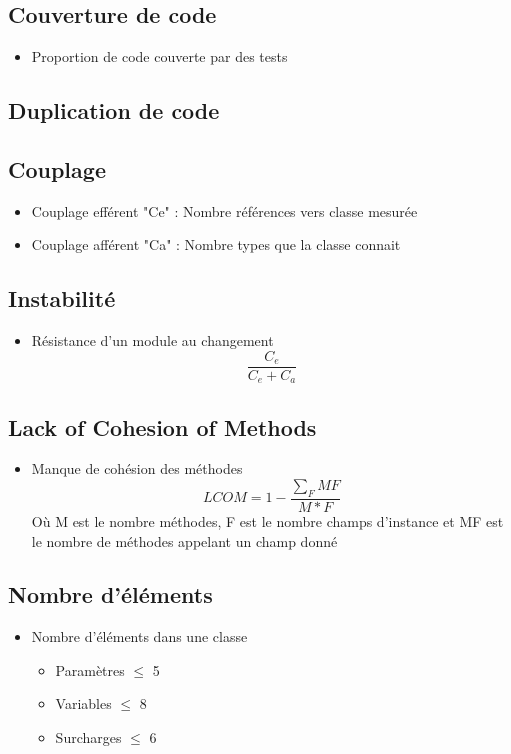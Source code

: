 \documentclass[10pt,a4paper]{article}
\begin{document}
\subsection*{Couverture de code}
\begin{itemize}
\item Proportion de code couverte par des tests  
\end{itemize}

\subsection*{Duplication de code}  

\subsection*{Couplage}  
\begin{itemize}
\item Couplage efférent "Ce"  : Nombre références vers classe mesurée  
\item Couplage afférent "Ca"  : Nombre types que la classe connait  
\end{itemize}

\subsection*{Instabilité}
\begin{itemize}
\item Résistance d'un module au changement  
\begin{equation}
\frac{C_{e}}{C_{e} + C_{a}}
\end{equation}
\end{itemize}

\subsection*{Lack of Cohesion of Methods}  
\begin{itemize}
\item Manque de cohésion des méthodes  
\begin{equation}
LCOM = 1 -  \frac{\sum_{F} MF}{M*F}
\end{equation}
Où M  est le nombre méthodes, F est le nombre champs d'instance et MF  est le nombre de méthodes appelant un champ donné  
\end{itemize}

\subsection*{Nombre d’éléments}  
\begin{itemize}
\item Nombre d'éléments dans une classe
\begin{itemize}
\item Paramètres $\leq$ 5 
\item Variables $\leq$ 8 
\item Surcharges $\leq$ 6  
\end{itemize}
\end{itemize}
\end{document}
